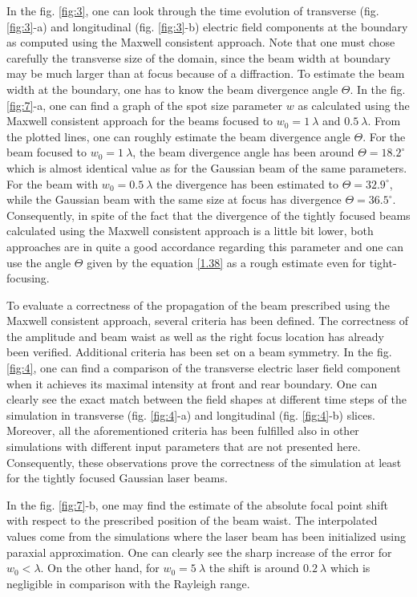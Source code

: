 In the fig. \ref{fig:3}, one can look through the time evolution of transverse (fig. \ref{fig:3}-a) and longitudinal (fig. \ref{fig:3}-b) electric field components at the boundary as computed using the Maxwell consistent approach. Note that one must chose carefully the transverse size of the domain, since the beam width at boundary may be much larger than at focus because of a diffraction. To estimate the beam width at the boundary, one has to know the beam divergence angle $ \Theta $. In the fig. \ref{fig:7}-a, one can find a graph of the spot size parameter $ w $ as calculated using the Maxwell consistent approach for the beams focused to $ w_0 = 1 \ \lambda $ and $ 0.5 \ \lambda $. From the plotted lines, one can roughly estimate the beam divergence angle $ \Theta $. For the beam focused to $ w_0 = 1 \ \lambda $, the beam divergence angle has been around $ \Theta = 18.2^{\circ} $ which is almost identical value as for the Gaussian beam of the same parameters. For the beam with $ w_0 = 0.5 \ \lambda $ the divergence has been estimated to $ \Theta = 32.9^{\circ} $, while the Gaussian beam with the same size at focus has divergence $ \Theta = 36.5^{\circ} $. Consequently, in spite of the fact that the divergence of the tightly focused beams calculated using the Maxwell consistent approach is a little bit lower, both approaches are in quite a good accordance regarding this parameter and one can use the angle $ \Theta $ given by the equation \ref{1.38} as a rough estimate even for tight-focusing.

To evaluate a correctness of the propagation of the beam prescribed using the Maxwell consistent approach, several criteria has been defined. The correctness of the amplitude and beam waist as well as the right focus location has already been verified. Additional criteria has been set on a beam symmetry. In the fig. \ref{fig:4}, one can find a comparison of the transverse electric laser field component when it achieves its maximal intensity at front and rear boundary. One can clearly see the exact match between the field shapes at different time steps of the simulation in transverse (fig. \ref{fig:4}-a) and longitudinal (fig. \ref{fig:4}-b) slices. Moreover, all the aforementioned criteria has been fulfilled also in other simulations with different input parameters that are not presented here. Consequently, these observations prove the correctness of the simulation at least for the tightly focused Gaussian laser beams.

In the fig. \ref{fig:7}-b, one may find the estimate of the absolute focal point shift with respect to the prescribed position of the beam waist. The interpolated values come from the simulations where the laser beam has been initialized using paraxial approximation. One can clearly see the sharp increase of the error for $ w_0 < \lambda $. On the other hand, for $ w_0 = 5 \ \lambda $ the shift is around $ 0.2 \ \lambda $ which is negligible in comparison with the Rayleigh range.

